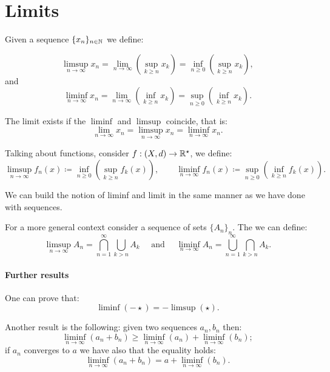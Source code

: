 \section{Limits} \label{liminf-limsup-defn}

Given a sequence $\{x_n\}_{n \in \mathbb N}$ we define:

$$
\limsup_{n\to\infty} x_n 
= \lim\limits_{n \to \infty} \left( \sup_{k \geq n} x_k \right)  
= \inf_{n\geq 0} \left( \sup_{k \geq n} x_k \right)  
,
$$
and
$$
\liminf_{n\to\infty} x_n 
= \lim\limits_{n \to \infty} \left( \inf_{k \geq n} x_k \right)  
= \sup_{n\geq 0} \left( \inf_{k \geq n} x_k \right)  
.
$$

The limit exists if the $\liminf$ and $\limsup$ coincide, that is:
$$
\lim_{n \to \infty} x_n 
= \limsup_{n \to \infty} x_n 
= \liminf_{n \to \infty} x_n
.
$$

Talking about functions, consider $f: (X,d) \to \mathbb R^\star$, we define:
$$ \limsup_{n\to \infty}f_n(x) \coloneqq \inf\limits_{n\geq0}\left(\sup\limits_{k\geq n} f_k(x) \right), \qquad \liminf_{n\to \infty}f_n(x) \coloneqq \sup\limits_{n\geq0}\left(\inf\limits_{k\geq n} f_k(x) \right).$$

We can build the notion of liminf and limit in the same manner as we have done with sequences.

For a more general context consider a sequence of sets $\{A_n\}_n$. The we can define:
$$
\limsup_{n \to \infty} A_n 
= \bigcap_{n=1}^\infty \bigcup_{k>n} A_k
\quad \text{ and } \quad
\liminf_{n \to \infty} A_n 
= \bigcup_{n=1}^\infty \bigcap_{k>n} A_k
.
$$

\paragraph{Further results}

One can prove that:
$$
\liminf( - \star)
= - \limsup(\star)
.
$$

Another result is the following: given two sequences $a_n, b_n$ then:
$$
\liminf_{n \to \infty} (a_n + b_n)
\geq \liminf_{n \to \infty} (a_n) + \liminf_{n \to \infty}(b_n)
;
$$
if $a_n$ converges to $a$ we have also that the equality holds:
$$
\liminf_{n \to \infty} (a_n + b_n)
= a + \liminf_{n \to \infty}(b_n)
.
$$

